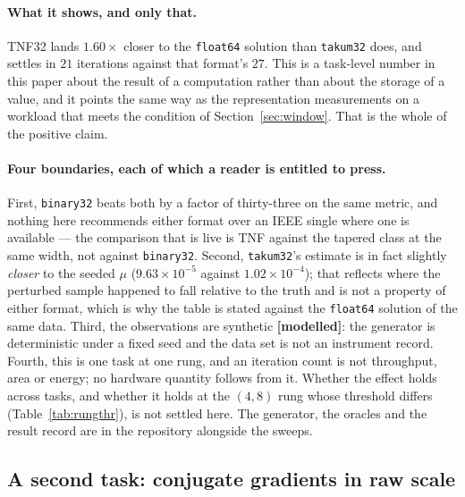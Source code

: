 \documentclass[11pt]{article}
\theoremstyle{definition}
\begin{document}
\paragraph{What it shows, and only that.} TNF32 lands $1.60\times$ closer to the
\texttt{float64} solution than \texttt{takum32} does, and settles in $21$
iterations against that format's $27$. This is a task-level number in this paper
about the result of a computation rather than about the storage of a value, and it
points the same way as the representation measurements on a workload that meets
the condition of Section~\ref{sec:window}. That is the whole of the positive
claim.

\paragraph{Four boundaries, each of which a reader is entitled to press.}
First, \texttt{binary32} beats both by a factor of thirty-three on the same
metric, and nothing here recommends either format over an IEEE single where one is
available --- the comparison that is live is TNF against the tapered class at the
same width, not against \texttt{binary32}. Second, \texttt{takum32}'s estimate is
in fact slightly \emph{closer} to the seeded $\mu$ ($9.63\times 10^{-5}$ against
$1.02\times 10^{-4}$); that reflects where the perturbed sample happened to fall
relative to the truth and is not a property of either format, which is why the
table is stated against the \texttt{float64} solution of the same data. Third, the
observations are synthetic \textbf{[modelled]}: the generator is deterministic
under a fixed seed and the data set is not an instrument record. Fourth, this is
one task at one rung, and an iteration count is not throughput, area or energy;
no hardware quantity follows from it. Whether the effect holds across tasks, and
whether it holds at the $(4,8)$ rung whose threshold differs
(Table~\ref{tab:rungthr}), is not settled here. The generator, the oracles and the
result record are in the repository alongside the sweeps.

\subsection{A second task: conjugate gradients in raw scale}
\label{sec:downstream-cg}
\end{document}
